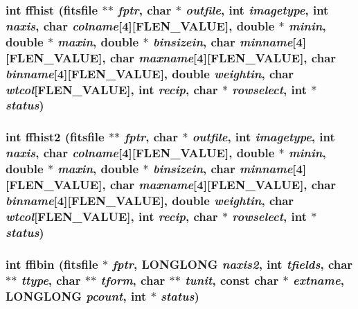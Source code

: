 \subsubsection{\setlength{\rightskip}{0pt plus 5cm}int ffhist (\bf{fitsfile} $\ast$$\ast$ {\em fptr}, char $\ast$ {\em outfile}, int {\em imagetype}, int {\em naxis}, char {\em colname}[4][FLEN\_\-VALUE], double $\ast$ {\em minin}, double $\ast$ {\em maxin}, double $\ast$ {\em binsizein}, char {\em minname}[4][FLEN\_\-VALUE], char {\em maxname}[4][FLEN\_\-VALUE], char {\em binname}[4][FLEN\_\-VALUE], double {\em weightin}, char {\em wtcol}[FLEN\_\-VALUE], int {\em recip}, char $\ast$ {\em rowselect}, int $\ast$ {\em status})}\label{test_2shm__client_2fitsio_8h_abc1ac3fe3154b853aec9e8069a53104}


\subsubsection{\setlength{\rightskip}{0pt plus 5cm}int ffhist2 (\bf{fitsfile} $\ast$$\ast$ {\em fptr}, char $\ast$ {\em outfile}, int {\em imagetype}, int {\em naxis}, char {\em colname}[4][FLEN\_\-VALUE], double $\ast$ {\em minin}, double $\ast$ {\em maxin}, double $\ast$ {\em binsizein}, char {\em minname}[4][FLEN\_\-VALUE], char {\em maxname}[4][FLEN\_\-VALUE], char {\em binname}[4][FLEN\_\-VALUE], double {\em weightin}, char {\em wtcol}[FLEN\_\-VALUE], int {\em recip}, char $\ast$ {\em rowselect}, int $\ast$ {\em status})}\label{test_2shm__client_2fitsio_8h_82fd106b8fa747b8b0895c6f1419c328}


\subsubsection{\setlength{\rightskip}{0pt plus 5cm}int ffibin (\bf{fitsfile} $\ast$ {\em fptr}, \bf{LONGLONG} {\em naxis2}, int {\em tfields}, char $\ast$$\ast$ {\em ttype}, char $\ast$$\ast$ {\em tform}, char $\ast$$\ast$ {\em tunit}, const char $\ast$ {\em extname}, \bf{LONGLONG} {\em pcount}, int $\ast$ {\em status})}\label{test_2shm__client_2fitsio_8h_a58067cf409aa0fa133a4794c43264a3}


